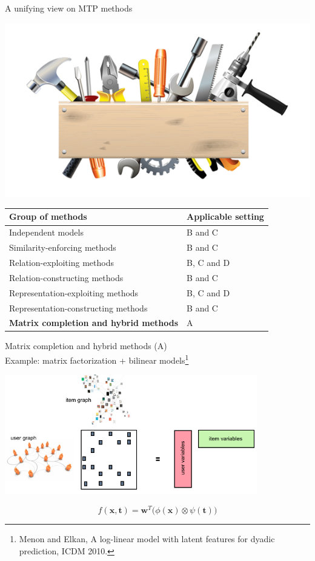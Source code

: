 \documentclass[]{beamer}
\renewcommand{\vec}[1]{\boldsymbol{#1}}
\renewcommand{\alert}[1]{\textbf{\color{putblue} #1}}
\begin{document}
\begin{frame}{A unifying view on MTP methods}

\begin{center}
\includegraphics[scale=0.3]{pics/tools}

\begin{tabular}{ll}
\hline
Group of methods & Applicable setting \\
\hline
\hline
Independent models & B and C \\
Similarity-enforcing methods & B and C   \\ 
Relation-exploiting methods & B, C and D  \\
Relation-constructing methods & B and C \\
Representation-exploiting methods & B, C and D \\
Representation-constructing methods & B and C \\
\alert{Matrix completion and hybrid methods} & A \\
\hline  
\end{tabular}
\end{center}
\end{frame}

\begin{frame}{Matrix completion and hybrid methods (A) \\
Example: matrix factorization + bilinear models\footnote{Menon and Elkan, A log-linear model with latent features for dyadic prediction, ICDM 2010.}}

\begin{center}
\includegraphics[width=11cm]{pics/settingA}
\end{center}

\vspace{-0.4cm}
\begin{equation*}
\label{eq:pairwise}
f(\vec{x},\vec{t}) = \vec{w}^T \big(\phi(\vec{x}) \otimes \psi(\vec{t})\big)    
\end{equation*}
\end{frame}
\end{document}
